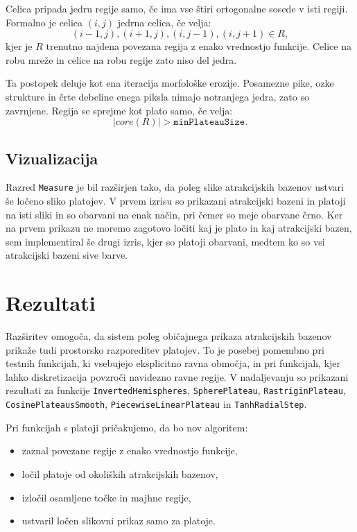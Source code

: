 \documentclass[12pt,a4paper]{article}
\begin{document}
Celica pripada jedru regije samo, če ima vse štiri ortogonalne sosede v isti regiji. Formalno je celica \((i,j)\) jedrna celica, če velja:
\[
(i-1,j), (i+1,j), (i,j-1), (i,j+1) \in R,
\]
kjer je \(R\) trenutno najdena povezana regija z enako vrednostjo funkcije. Celice na robu mreže in celice na robu regije zato niso del jedra.

Ta postopek deluje kot ena iteracija morfološke erozije. Posamezne pike, ozke strukture in črte debeline enega piksla nimajo notranjega jedra, zato so zavrnjene. Regija se sprejme kot plato samo, če velja:
\[
|core(R)| > \texttt{minPlateauSize}.
\]


\subsection{Vizualizacija}

Razred \texttt{Measure} je bil razširjen tako, da poleg slike atrakcijskih bazenov ustvari še ločeno sliko platojev. V prvem izrisu so prikazani atrakcijski bazeni in platoji na isti sliki in so obarvani na enak način, pri čemer so meje obarvane črno. Ker na prvem prikazu ne moremo zagotovo ločiti kaj je plato in kaj atrakcijski bazen, sem implementiral še drugi izris, kjer so platoji obarvani, medtem ko so vsi atrakcijski bazeni sive barve. 

\section{Rezultati}

Razširitev omogoča, da sistem poleg običajnega prikaza atrakcijskih bazenov prikaže tudi prostorsko razporeditev platojev. To je posebej pomembno pri testnih funkcijah, ki vsebujejo eksplicitno ravna območja, in pri funkcijah, kjer lahko diskretizacija povzroči navidezno ravne regije. V nadaljevanju so prikazani rezultati za funkcije \texttt{InvertedHemispheres}, \texttt{SpherePlateau}, \texttt{RastriginPlateau}, \texttt{CosinePlateausSmooth}, \texttt{PiecewiseLinearPlateau} in \texttt{TanhRadialStep}.

Pri funkcijah s platoji pričakujemo, da bo nov algoritem:

\begin{itemize}
    \item zaznal povezane regije z enako vrednostjo funkcije,
    \item ločil platoje od okoliških atrakcijskih bazenov,
    \item izločil osamljene točke in majhne regije,
    \item ustvaril ločen slikovni prikaz samo za platoje.
\end{itemize}
\end{document}
